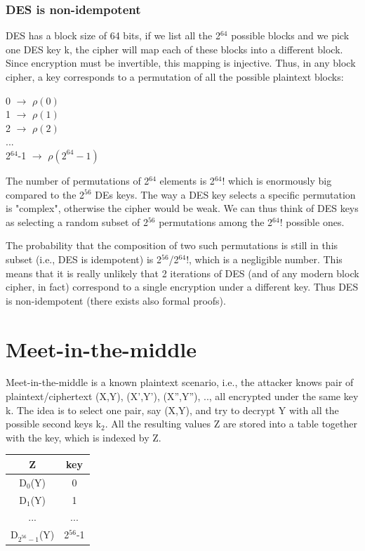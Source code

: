 \documentclass[a4paper, 12pt]{report}
\begin{document}
\subsubsection{DES is non-idempotent}
DES has a block size of 64 bits, if we list all the 2$^{64}$ possible blocks and we pick one DES key k, the cipher will map each of these blocks into a different block. Since encryption must be invertible, this mapping is injective. Thus, in any block cipher, a key corresponds to a permutation of all the possible plaintext blocks:
\begin{center}
	0 $\rightarrow$ $\rho(0)$\\
	1 $\rightarrow$ $\rho(1)$\\
	2 $\rightarrow$ $\rho(2)$\\
	...\\
	2$^{64}$-1 $\rightarrow$ $\rho(2^{64}-1)$
\end{center}
The number of permutations of 2$^{64}$ elements is 2$^{64}!$ which is enormously big compared to the 2$^{56}$ DEs keys. The way a DES key selects a specific permutation is "complex", otherwise the cipher would be weak. We can thus think of DES keys as selecting a random subset of 2$^{56}$ permutations among the 2$^{64}!$ possible ones.

The probability that the composition of two such permutations is still in this subset (i.e., DES is idempotent) is 2$^{56}$/2$^{64}!$, which is a negligible number. This means that it is really unlikely that 2 iterations of DES (and of any modern block cipher, in fact) correspond to a single encryption under a different key. Thus DES is non-idempotent (there exists also formal proofs).

\section*{Meet-in-the-middle}
Meet-in-the-middle is a known plaintext scenario, i.e., the attacker knows pair of plaintext/ciphertext (X,Y), (X',Y'), (X'',Y''), .., all encrypted under the same key k. The idea is to select one pair, say (X,Y), and try to decrypt Y with all the possible second keys k$_2$. All the resulting values Z are stored into a table together with the key, which is indexed by Z.
\begin{table}[H]
	\centering
	\begin{tabular}{|c|c|}
		\hline
		\textbf{Z} & \textbf{key}\\ \hline
		D$_0$(Y) & 0\\
		D$_1$(Y) & 1\\
		... & ...\\
		D$_{2^{56}-1}$(Y) & 2$^{56}$-1\\ \hline
	\end{tabular}
\end{table} 
\end{document}
